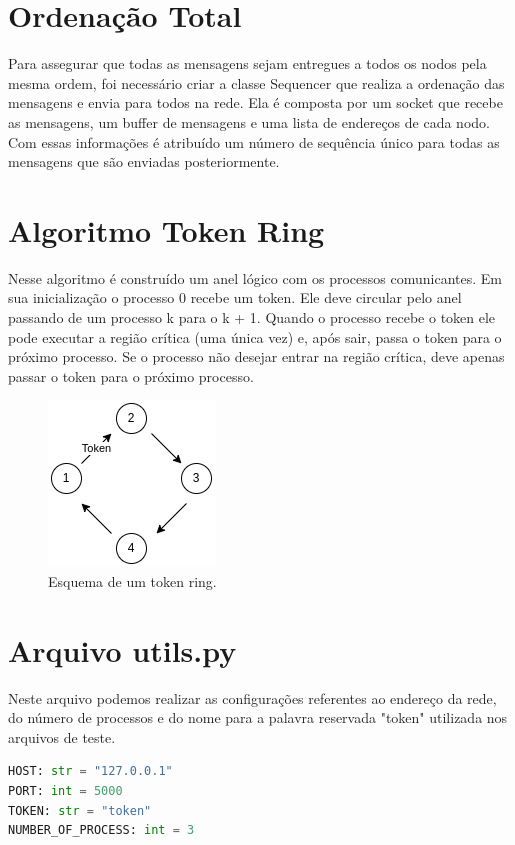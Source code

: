 \documentclass[
	12pt,				%
	openright,			%
	oneside,			%
	a4paper,			%
	english,			%
	french,				%
	spanish,			%
	brazil				%
	]{abntex2}
\begin{document}
\section{Ordenação Total}
Para assegurar que todas as mensagens sejam entregues a todos os nodos pela mesma ordem,
foi necessário criar a classe Sequencer que realiza a ordenação das mensagens e envia
para todos na rede. Ela é composta por um socket que recebe as mensagens, um buffer de mensagens e uma lista de endereços
de cada nodo. Com essas informações é atribuído um número de sequência único para todas 
as mensagens que são enviadas posteriormente.

\section{Algoritmo Token Ring}
Nesse algoritmo é construído um anel lógico com os processos comunicantes.
Em sua inicialização o processo 0 recebe um token. Ele deve circular 
pelo anel passando de um processo k para o k + 1. Quando o processo
recebe o token ele pode executar a região crítica (uma única vez) e, após sair,
passa o token para o próximo processo. Se o processo não desejar entrar na 
região crítica, deve apenas passar o token para o próximo processo.

\begin{figure}[!h]
    \centering
    \includegraphics[scale=0.9]{token.jpg}
    \caption{Esquema de um token ring.}
    \label{fig:token}
\end{figure}

\section{Arquivo utils.py}
Neste arquivo podemos realizar as configurações referentes ao endereço
da rede, do número de processos e do nome para a palavra reservada "token" utilizada
nos arquivos de teste.

\begin{lstlisting}[language=python]
HOST: str = "127.0.0.1"
PORT: int = 5000
TOKEN: str = "token"
NUMBER_OF_PROCESS: int = 3
\end{lstlisting}
\end{document}
